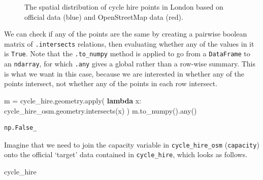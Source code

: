 \documentclass[
  letterpaper,
]{krantz}
\newenvironment{Shaded}{\begin{snugshade}}{\end{snugshade}}
\newcommand{\BuiltInTok}[1]{\textcolor[rgb]{0.00,0.23,0.31}{#1}}
\newcommand{\KeywordTok}[1]{\textcolor[rgb]{0.00,0.23,0.31}{\textbf{#1}}}
\newcommand{\NormalTok}[1]{\textcolor[rgb]{0.00,0.23,0.31}{#1}}
\newcommand{\OperatorTok}[1]{\textcolor[rgb]{0.37,0.37,0.37}{#1}}
\begin{document}
\begin{figure}[H]


\caption{\label{fig-cycle-hire}The spatial distribution of cycle hire
points in London based on official data (blue) and OpenStreetMap data
(red).}

\end{figure}%

We can check if any of the points are the same by creating a pairwise
boolean matrix of \texttt{.intersects} relations, then evaluating
whether any of the values in it is \texttt{True}. Note that the
\texttt{.to\_numpy} method is applied to go from a \texttt{DataFrame} to
an \texttt{ndarray}, for which \texttt{.any} gives a global rather than
a row-wise summary. This is what we want in this case, because we are
interested in whether any of the points intersect, not whether any of
the points in each row intersect.

\begin{Shaded}
\begin{Highlighting}[]
\NormalTok{m }\OperatorTok{=}\NormalTok{ cycle\_hire.geometry.}\BuiltInTok{apply}\NormalTok{(}
  \KeywordTok{lambda}\NormalTok{ x: cycle\_hire\_osm.geometry.intersects(x)}
\NormalTok{)}
\NormalTok{m.to\_numpy().}\BuiltInTok{any}\NormalTok{()}
\end{Highlighting}
\end{Shaded}

\begin{verbatim}
np.False_
\end{verbatim}

Imagine that we need to join the capacity variable in
\texttt{cycle\_hire\_osm}
(\texttt{\textquotesingle{}capacity\textquotesingle{}}) onto the
official `target' data contained in \texttt{cycle\_hire}, which looks as
follows.

\begin{Shaded}
\begin{Highlighting}[]
\NormalTok{cycle\_hire}
\end{Highlighting}
\end{Shaded}
\end{document}
